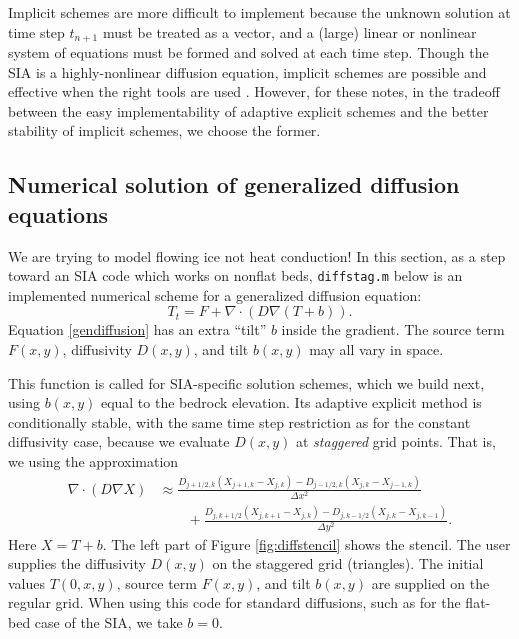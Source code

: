 \documentclass[letterpaper,final,12pt,reqno]{amsart}
\newcommand{\grad}{\nabla}
\newcommand{\Div}{\nabla\cdot}
\newcommand{\minput}[1]{
\vspace{0.8cm}
\VerbatimInput[frame=single,framesep=3mm,label=\fbox{\normalsize \textsl{\,#1.m\,}},fontfamily=courier,fontsize=\footnotesize]{tmp/#1.slim.m}
\vspace{0.5cm}
}
\begin{document}
Implicit schemes are more difficult to implement because the unknown solution at time step $t_{n+1}$ must be treated as a vector, and a (large) linear or nonlinear system of equations must be formed and solved at each time step.  Though the SIA is a highly-nonlinear diffusion equation, implicit schemes are possible and effective when the right tools are used \cite{Bueler2016}.  However, for these notes, in the tradeoff between the easy implementability of adaptive explicit schemes and the better stability of implicit schemes, we choose the former. 

\subsection*{Numerical solution of generalized diffusion equations}  We are trying to model flowing ice not heat conduction!  In this section, as a step toward an SIA code which works on nonflat beds, \texttt{diffstag.m} below is an implemented numerical scheme for a generalized diffusion equation:
\begin{equation}
  T_t = F + \Div \left(D \grad (T + b)\right). \label{gendiffusion}
\end{equation}
Equation \eqref{gendiffusion} has an extra ``tilt'' $b$ inside the gradient.  The source term $F(x,y)$, diffusivity $D(x,y)$, and tilt $b(x,y)$ may all vary in space.

\minput{diffstag}

This function is called for SIA-specific solution schemes, which we build next, using $b(x,y)$ equal to the bedrock elevation.  Its adaptive explicit method is conditionally stable, with the same time step restriction as for the constant diffusivity case, because we evaluate $D(x,y)$ at \emph{staggered} grid points.  That is, we using the approximation
\begin{align*}
\Div \left(D \grad X\right) &\approx \frac{D_{j+1/2,k}(X_{j+1,k} - X_{j,k}) - D_{j-1/2,k}(X_{j,k} - X_{j-1,k})}{\Delta x^2} \\
	&\qquad + \frac{D_{j,k+1/2}(X_{j,k+1} - X_{j,k}) - D_{j,k-1/2}(X_{j,k} - X_{j,k-1})}{\Delta y^2}.
\end{align*}
Here $X=T+b$.  The left part of Figure \ref{fig:diffstencil} shows the stencil.  The user supplies the diffusivity $D(x,y)$ on the staggered grid (triangles).  The initial values $T(0,x,y)$, source term $F(x,y)$, and tilt $b(x,y)$ are supplied on the regular grid.  When using this code for standard diffusions, such as for the flat-bed case of the SIA, we take $b=0$.
\end{document}

